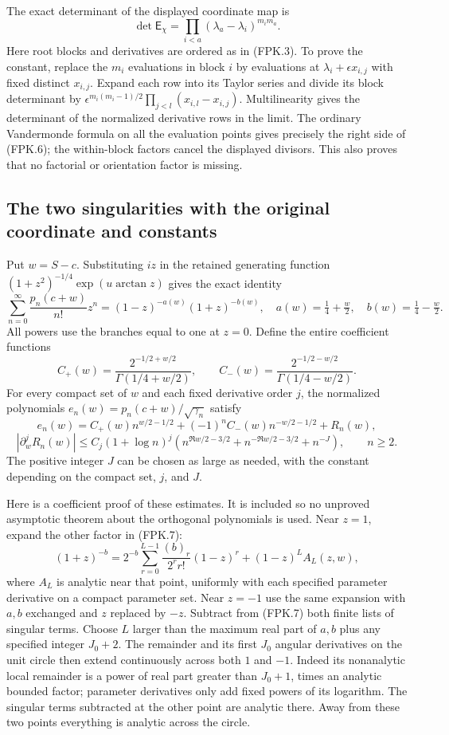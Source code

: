 The exact determinant of the displayed coordinate map is
\[
 \det\mathsf E_\chi
       =\prod_{i<a}(\lambda_a-\lambda_i)^{m_i m_a}.
 \tag{FPK.6}
\]
Here root blocks and derivatives are ordered as in (FPK.3).
To prove the constant, replace the $m_i$ evaluations in block $i$
by evaluations at $\lambda_i+\epsilon x_{i,j}$ with fixed distinct
$x_{i,j}$. Expand each row into its Taylor series and divide its
block determinant by
$\epsilon^{m_i(m_i-1)/2}\prod_{j<l}(x_{i,l}-x_{i,j})$.
Multilinearity gives the determinant of the normalized derivative
rows in the limit. The ordinary Vandermonde formula on all the
evaluation points gives precisely the right side of (FPK.6);
the within-block factors cancel the displayed divisors. This also
proves that no factorial or orientation factor is missing.

\subsection{The two singularities with the original coordinate and constants}

Put $w=S-c$. Substituting $iz$ in the retained generating function
$(1+z^2)^{-1/4}\exp(u\arctan z)$ gives the exact identity
\[
 \sum_{n=0}^\infty \frac{p_n(c+w)}{n!}z^n
    =(1-z)^{-a(w)}(1+z)^{-b(w)},
 \quad a(w)=\tfrac14+\tfrac w2,
 \quad b(w)=\tfrac14-\tfrac w2.
 \tag{FPK.7}
\]
All powers use the branches equal to one at $z=0$. Define the entire
coefficient functions
\[
 C_+(w)=\frac{2^{-1/2+w/2}}{\Gamma(1/4+w/2)},\qquad
 C_-(w)=\frac{2^{-1/2-w/2}}{\Gamma(1/4-w/2)}.
 \tag{FPK.8}
\]
For every compact set of $w$ and each fixed derivative order $j$,
the normalized polynomials $e_n(w)=p_n(c+w)/\sqrt{\gamma_n}$ satisfy
\[
 e_n(w)=C_+(w)n^{w/2-1/2}
           +(-1)^n C_-(w)n^{-w/2-1/2}+R_n(w),
 \tag{FPK.9}
\]
\[
 |\partial_w^jR_n(w)|
 \leq C_j(1+\log n)^j
       \left(n^{\Re w/2-3/2}+n^{-\Re w/2-3/2}
                         +n^{-J}\right),\qquad n\geq2.
 \tag{FPK.10}
\]
The positive integer $J$ can be chosen as large as needed, with the
constant depending on the compact set, $j$, and $J$.

Here is a coefficient proof of these estimates. It is included so no
unproved asymptotic theorem about the orthogonal polynomials is used.
Near $z=1$, expand the other factor in (FPK.7):
\[
 (1+z)^{-b}=2^{-b}
   \sum_{r=0}^{L-1}\frac{(b)_r}{2^r r!}(1-z)^r
            +(1-z)^L A_L(z,w),
 \tag{FPK.11}
\]
where $A_L$ is analytic near that point, uniformly with each specified
parameter derivative on a compact parameter set. Near $z=-1$ use the
same expansion with $a,b$ exchanged and $z$ replaced by $-z$.
Subtract from (FPK.7) both finite lists of singular terms. Choose $L$
larger than the maximum real part of $a,b$ plus any specified integer
$J_0+2$. The remainder and its first $J_0$ angular derivatives on the
unit circle then extend continuously across both $1$ and $-1$.
Indeed its nonanalytic local remainder is a power of real part greater
than $J_0+1$, times an analytic bounded factor; parameter derivatives
only add fixed powers of its logarithm. The singular terms subtracted
at the other point are analytic there. Away from these two points
everything is analytic across the circle.

